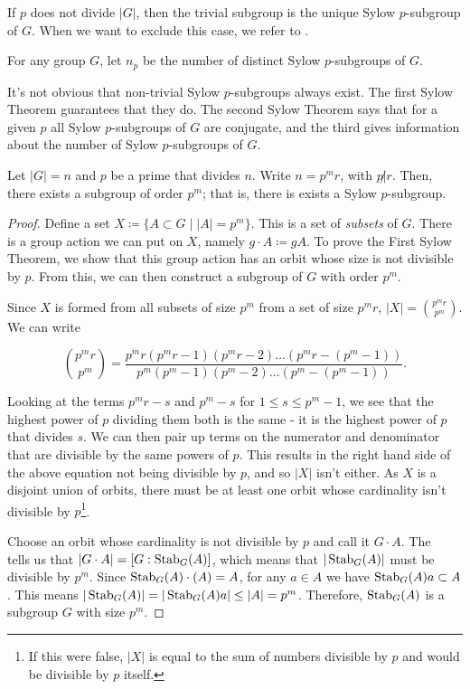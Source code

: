 If \(p\) does not divide \(|G|\), then the trivial subgroup is the unique Sylow \(p\)-subgroup of \(G\). When we want to exclude this case, we refer to .

\begin{definition}
  For any group \(G\), let \(n_{p}\) be the number of distinct Sylow \(p\)-subgroups of \(G\).
\end{definition}

It's not obvious that non-trivial Sylow \(p\)-subgroups always exist. The first Sylow Theorem guarantees that they do. The second Sylow Theorem says that for a given \(p\) all Sylow \(p\)-subgroups of \(G\) are conjugate, and the third gives information about the number of Sylow \(p\)-subgroups of \(G\).

\begin{theorem}[Sylow 1]\label{thm:group-theory:Sylow-1}
  Let \(|G| = n\) and \(p\) be a prime that divides \(n\). Write \(n = p^{m}r\), with \(p \not| r\). Then, there exists a subgroup of order \(p^{m}\); that is, there is exists a Sylow \(p\)-subgroup.
\end{theorem}

\begin{proof}
  Define a set \(X \coloneqq \{ A \subset G \mid |A| = p^{m}\}\). This is a set of \textit{subsets} of \(G\). There is a group action we can put on \(X\), namely \(g \cdot A \coloneqq gA\). To prove the First Sylow Theorem, we show that this group action has an orbit whose size is not divisible by \(p\). From this, we can then construct a subgroup of \(G\) with order \(p^{m}\).

  Since \(X\) is formed from all subsets of size \(p^{m}\) from a set of size \(p^{m} r\), \(|X| = {p^{m}r \choose p^{m}}\). We can write

  \[{p^{m}r \choose p^{m}} = \frac{p^{m}r(p^{m}r-1)(p^{m}r -2) \ldots (p^{m}r - (p^{m}-1))}{p^{m}(p^{m} - 1)(p^{m} - 2)\ldots(p^{m} - (p^{m} - 1))}.\]

  Looking at the terms \(p^{m}r - s\) and \(p^{m} - s\) for \(1 \leq s \leq p^{m}-1\), we see that the highest power of \(p\) dividing them both is the same - it is the highest power of \(p\) that divides \(s\). We can then pair up terms on the numerator and denominator that are divisible by the same powers of \(p\). This results in the right hand side of the above equation not being divisible by \(p\), and so \(|X|\) isn't either. As \(X\) is a disjoint union of orbits, there must be at least one orbit whose cardinality isn't divisible by \(p\)\footnote{If this were false, \(|X|\) is equal to the sum of numbers divisible by \(p\) and would be divisible by \(p\) itself.}.

  Choose an orbit whose cardinality is not divisible by \(p\) and call it \(G \cdot A\). The~ tells us that \(|G \cdot A| = [G : \operatorname{Stab}_{G}(A)]\), which means that \(|\operatorname{Stab}_{G}(A)|\) must be divisible by \(p^{m}\). Since \(\operatorname{Stab}_{G}(A) \cdot (A) = A\), for any \(a \in A\) we have \(\operatorname{Stab}_{G}(A)a \subset A\). This means \(|\operatorname{Stab}_{G}(A)| = |\operatorname{Stab}_{G}(A)a| \leq |A| = p^{m}\). Therefore, \(\operatorname{Stab}_{G}(A)\) is a subgroup \(G\) with size \(p^{m}\).
\end{proof}


